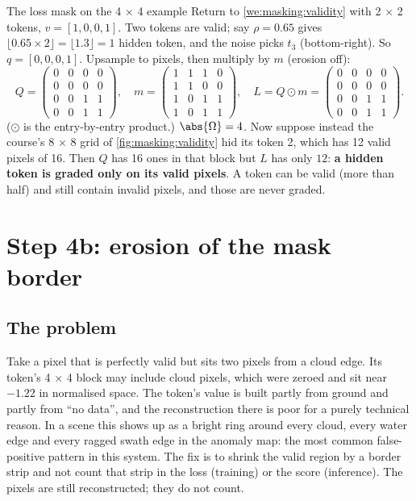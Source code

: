 \begin{worked}[label={we:masking:lossmask}]{The loss mask on the 4 \texorpdfstring{$\times$}{x} 4 example}
Return to \cref{we:masking:validity} with 2 $\times$ 2 tokens, $v = [1, 0, 0, 1]$. Two tokens are
valid; say $\rho = 0.65$ gives $\lfloor 0.65 \times 2 \rfloor = \lfloor 1.3 \rfloor = 1$ hidden token,
and the noise picks $t_3$ (bottom-right). So $q = [0, 0, 0, 1]$. Upsample to pixels, then multiply by
$m$ (erosion off):
\[
Q = \begin{pmatrix} 0&0&0&0\\0&0&0&0\\0&0&1&1\\0&0&1&1 \end{pmatrix},\quad
m = \begin{pmatrix} 1&1&1&0\\1&1&0&0\\1&0&1&1\\1&0&1&1 \end{pmatrix},\quad
L = Q \odot m = \begin{pmatrix} 0&0&0&0\\0&0&0&0\\0&0&1&1\\0&0&1&1 \end{pmatrix}.
\]
($\odot$ is the entry-by-entry product.) $\abs{\Omega} = 4$. Now suppose instead the course's 8
$\times$ 8 grid of \cref{fig:masking:validity} hid its token 2, which has 12 valid pixels of 16. Then
$Q$ has 16 ones in that block but $L$ has only $12$: \textbf{a hidden token is graded only on its valid
pixels}. A token can be valid (more than half) and still contain invalid pixels, and those are never
graded.
\end{worked}

\section{Step 4b: erosion of the mask border}\label{sec:masking:erosion}

\subsection{The problem}

Take a pixel that is perfectly valid but sits two pixels from a cloud edge. Its token's 4 $\times$ 4
block may include cloud pixels, which were zeroed and sit near $-1.22$ in normalised space. The
token's value is built partly from ground and partly from ``no data'', and the reconstruction there is
poor for a purely technical reason. In a scene this shows up as a bright ring around every cloud, every
water edge and every ragged swath edge in the anomaly map: the most common false-positive pattern in
this system. The fix is to shrink the valid region by a border strip and not count that strip in the
loss (training) or the score (inference). The pixels are still reconstructed; they do not count.

